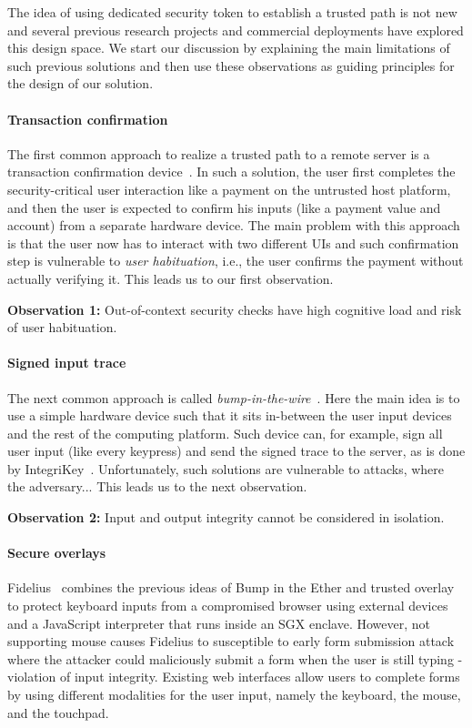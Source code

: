 The idea of using dedicated security token to establish a trusted path is not new and several previous research projects and commercial deployments have explored this design space. We start our discussion by explaining the main limitations of such previous solutions and then use these observations as guiding principles for the design of our solution. 
	
\paragraph{Transaction confirmation} 
The first common approach to realize a trusted path to a remote server is a transaction confirmation device~\cite{x}. In such a solution, the user first completes the security-critical user interaction like a payment on the untrusted host platform, and then the user is expected to confirm his inputs (like a payment value and account) from a separate hardware device. The main problem with this approach is that the user now has to interact with two different UIs and such confirmation step is vulnerable to \emph{user habituation}, i.e., the user confirms the payment without actually verifying it. This leads us to our first observation.  

\begin{tcolorbox}
\textbf{Observation 1:} Out-of-context security checks have high cognitive load and risk of user habituation. 
\end{tcolorbox}

\paragraph{Signed input trace}
The next common approach is called \emph{bump-in-the-wire}~\cite{x}. Here the main idea is to use a simple hardware device such that it sits in-between the user input devices and the rest of the computing platform. Such device can, for example, sign all user input (like every keypress) and send the signed trace to the server, as is done by IntegriKey~\cite{IntegriKey}. Unfortunately, such solutions are vulnerable to attacks, where the adversary... This leads us to the next observation.

\begin{tcolorbox}
\textbf{Observation 2:} Input and output integrity cannot be considered in isolation.
\end{tcolorbox}

\paragraph{Secure overlays} 
Fidelius~\cite{Fidelius} combines the previous ideas of Bump in the Ether and trusted overlay to protect keyboard inputs from a compromised browser using external devices and a JavaScript interpreter that runs inside an SGX enclave. However, not supporting mouse causes Fidelius to susceptible to early form submission attack where the attacker could maliciously submit a form when the user is still typing - violation of input integrity. Existing web interfaces allow users to complete forms by using different modalities for the user input, namely the keyboard, the mouse, and the touchpad. 

